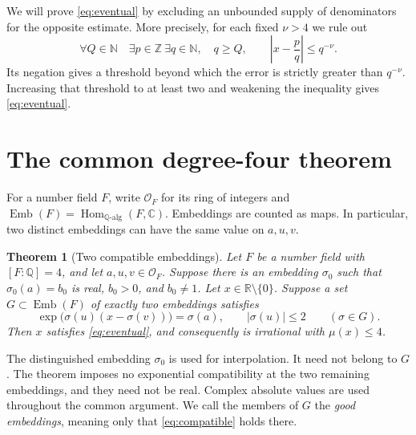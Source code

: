 \documentclass[11pt]{article}
\newtheorem{theorem}{Theorem}[section]
\theoremstyle{definition}
\theoremstyle{remark}
\theoremstyle{plain}
\newcommand{\Q}{\mathbb Q}
\newcommand{\Z}{\mathbb Z}
\newcommand{\N}{\mathbb N}
\newcommand{\R}{\mathbb R}
\newcommand{\C}{\mathbb C}
\newcommand{\OO}{\mathcal O}
\newcommand{\Emb}{\operatorname{Emb}}
\begin{document}
We will prove \eqref{eq:eventual} by excluding an unbounded supply of
denominators for the opposite estimate. More precisely, for each fixed
\(\nu>4\) we rule out
\begin{equation}\label{eq:bad}
 \forall Q\in\N\quad\exists p\in\Z\ \exists q\in\N,\quad
 q\ge Q,\qquad \left|x-\frac pq\right|\le q^{-\nu}.
\end{equation}
Its negation gives a threshold beyond which the error is strictly greater
than \(q^{-\nu}\). Increasing that threshold to at least two and
weakening the inequality gives \eqref{eq:eventual}.

\section{The common degree-four theorem}\label{sec:common}
For a number field \(F\), write \(\OO_F\) for its ring of integers and
\(\Emb(F)=\operatorname{Hom}_{\Q\text{-alg}}(F,\C)\). Embeddings are
counted as maps. In particular, two distinct embeddings can have the same
value on \(a,u,v\).

\begin{theorem}[Two compatible embeddings]\label{thm:common}
Let \(F\) be a number field with \([F:\Q]=4\), and let
\(a,u,v\in\OO_F\). Suppose there is an embedding \(\sigma_0\)
such that \(\sigma_0(a)=b_0\) is real, \(b_0>0\), and \(b_0\ne1\).
Let \(x\in\R\setminus\{0\}\). Suppose a set
\(G\subset\Emb(F)\) of exactly two embeddings satisfies
\begin{equation}\label{eq:compatible}
 \exp\bigl(\sigma(u)(x-\sigma(v))\bigr)=\sigma(a),
 \qquad |\sigma(u)|\le2\qquad(\sigma\in G).
\end{equation}
Then \(x\) satisfies \eqref{eq:eventual}, and consequently is irrational
with \(\mu(x)\le4\).
\end{theorem}

The distinguished embedding \(\sigma_0\) is used for interpolation.
It need not belong to \(G\). The theorem imposes no exponential
compatibility at the two remaining embeddings, and they need not be real.
Complex absolute values are used throughout the common argument. We call
the members of \(G\) the \emph{good embeddings}, meaning only that
\eqref{eq:compatible} holds there.
\end{document}
